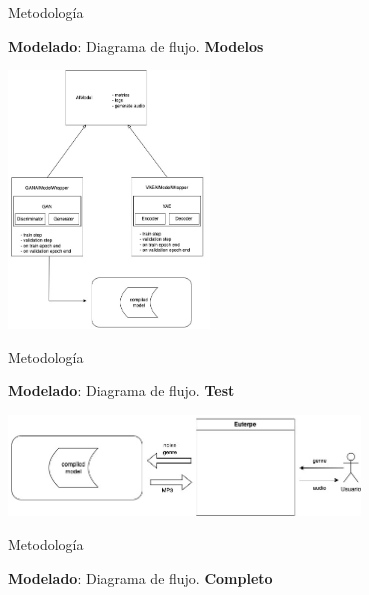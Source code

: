\documentclass{beamer}
\begin{document}
\begin{frame}{Metodología}
  \begin{center}
    \textbf{Modelado}: Diagrama de flujo. \textbf{Modelos}
  \end{center}
  \begin{center}
    \includegraphics[width=0.4\textwidth]{images/diagrama_flujo_modelos.png}
  \end{center}
\end{frame}

\begin{frame}{Metodología}
  \begin{center}
    \textbf{Modelado}: Diagrama de flujo. \textbf{Test}
  \end{center}
  \begin{center}
    \includegraphics[width=0.7\textwidth]{images/diagrama_flujo_test.png}
  \end{center}
\end{frame}

\begin{frame}{Metodología}
  \begin{center}
    \textbf{Modelado}: Diagrama de flujo. \textbf{Completo}
  \end{center}
  \begin{center}
    \hspace*{0.5cm}
  \end{center}  
\end{frame}
\end{document}
